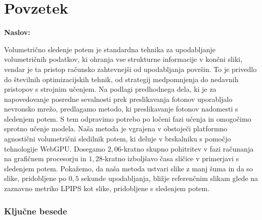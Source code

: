 {}
\chapter*{Povzetek}

\noindent\textbf{Naslov:} \ttitle
\bigskip

Volumetrično sledenje potem je standardna tehnika za upodabljanje volumetričnih
podatkov, ki ohranja vse strukturne informacije v končni sliki, vendar je ta
pristop računsko zahtevnejši od upodabljanja površin. To je privedlo do
številnih optimizacijskih tehnik, od strategij medpomnjenja do nedavnih
pristopov s strojnim učenjem. Na podlagi predhodnega dela, ki je za napovedovanje
posredne sevalnosti prek preslikavanja fotonov uporabljalo nevronsko mrežo,
predlagamo metodo, ki preslikavanje fotonov nadomesti s sledenjem potem. S tem
odpravimo potrebo po ločeni fazi učenja in omogočimo sprotno učenje modela.
Naša metoda je vgrajena v obstoječi platformno agnostični volumetrični sledilnik
potem, ki deluje v brskalniku s pomočjo tehnologije \mbox{WebGPU}. Dosegamo
$2{,}06$-kratno skupno pohitritev v fazi računanja na grafičnem procesorju in
$1{,}28$-kratno izboljšavo časa sličice v primerjavi s sledenjem potem. Pokažemo,
da naša metoda ustvari slike z manj šuma in da so slike, pridobljene po
$0{,}5$ sekunde upodabljanja, bližje referenčnim slikam glede na zaznavno metriko
LPIPS kot slike, pridobljene s sledenjem potem.

\subsection*{Ključne besede}
\textit{\tkeywords}
\clearemptydoublepage

